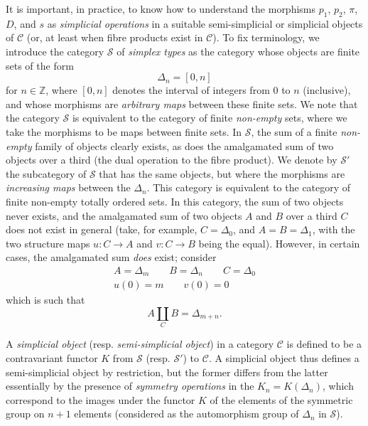 \documentclass{article}
\newcommand{\oldpage}[1]{\marginpar{\footnotesize$\Big\vert$ \textit{p.~#1}}}
\theoremstyle{definition}
\theoremstyle{definition}
\theoremstyle{definition}
\theoremstyle{definition}
\theoremstyle{remark}
\begin{document}
It is important, in practice, to know how to understand the morphisms \(p_1\), \(p_2\), \(\pi\), \(D\), and \(s\) as \emph{simplicial operations} in a suitable semi-simplicial or simplicial objects of \({\mathcal{C}}\) (or, at least when fibre products exist in \({\mathcal{C}}\)).
To fix terminology, we introduce the category \({\mathcal{S}}\) of \emph{simplex types} as the category whose objects are finite sets of the form
\[
  \Delta_n = [0,n]
\]
for \(n\in\mathbb{Z}\), where \([0,n]\) denotes the interval of integers from \(0\) to \(n\) (inclusive), and whose morphisms are \emph{arbitrary maps} between these finite sets.
We note that the category \({\mathcal{S}}\) is equivalent to the category of finite \emph{non-empty} sets, where we take the morphisms to be maps between finite sets.
In \({\mathcal{S}}\), the sum of a finite \emph{non-empty} family of objects clearly exists, as does the amalgamated sum of two objects over a third (the dual operation to the fibre product).
We denote by \({\mathcal{S}}'\) the subcategory of \({\mathcal{S}}\) that has the same objects, but where the morphisms are \emph{increasing maps} between the \(\Delta_n\).
This category is equivalent to the category of finite non-empty totally ordered sets.
\oldpage{212-10}In this category, the sum of two objects never exists, and the amalgamated sum of two objects \(A\) and \(B\) over a third \(C\) does not exist in general (take, for example, \(C=\Delta_0\), and \(A=B=\Delta_1\), with the two structure maps \(u\colon C\to A\) and \(v\colon C\to B\) being the equal).
However, in certain cases, the amalgamated sum \emph{does} exist;
consider
\[
  \begin{gathered}
    A = \Delta_m
    \qquad B = \Delta_n
    \qquad C = \Delta_0
  \\u(0) = m
    \qquad v(0) = 0
  \end{gathered}
\]
which is such that
\[
  A\coprod_C B = \Delta_{m+n}.
\]

A \emph{simplicial object} (resp. \emph{semi-simplicial object}) in a category \({\mathcal{C}}\) is defined to be a contravariant functor \(K\) from \({\mathcal{S}}\) (resp. \({\mathcal{S}}'\)) to \({\mathcal{C}}\).
A simplicial object thus defines a semi-simplicial object by restriction, but the former differs from the latter essentially by the presence of \emph{symmetry operations} in the \(K_n=K(\Delta_n)\), which correspond to the images under the functor \(K\) of the elements of the symmetric group on \(n+1\) elements (considered as the automorphism group of \(\Delta_n\) in \({\mathcal{S}}\)).
\end{document}
